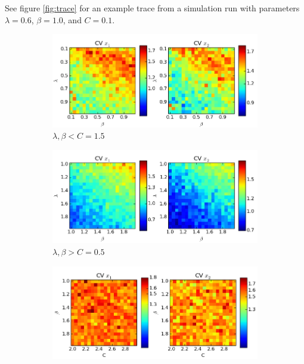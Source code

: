 \documentclass[a4paper,12pt]{article}
\begin{document}
See figure \ref{fig:trace} for an example trace from a simulation run with parameters $\lambda=0.6$, $\beta=1.0$, and $C=0.1$.

\begin{figure}[!ht]
        \centering
        \begin{subfigure}[b]{0.49\textwidth}
                \includegraphics[width=\textwidth]{images/vars1}
                \caption{$\lambda, \beta < C=1.5$}
                \label{fig:vars1}
        \end{subfigure}%
        \hfill
        \begin{subfigure}[b]{0.49\textwidth}
                \includegraphics[width=\textwidth]{images/vars2}
                \caption{$\lambda, \beta > C=0.5$}
                \label{fig:vars2}
        \end{subfigure}
          \newline
        \begin{subfigure}[b]{0.496\textwidth}
        \centering
                \includegraphics[width=\textwidth]{images/vars3}

\end{subfigure}
\end{figure}
\end{document}
